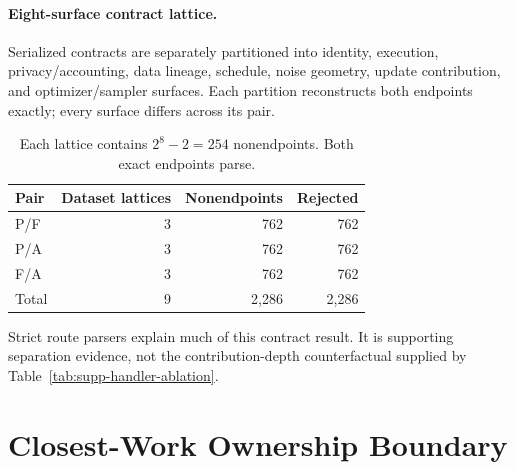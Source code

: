 \documentclass[letterpaper]{article}
\begin{document}
\paragraph{Eight-surface contract lattice.}
Serialized contracts are separately partitioned into identity, execution,
privacy/accounting, data lineage, schedule, noise geometry, update
contribution, and optimizer/sampler surfaces.  Each partition reconstructs
both endpoints exactly; every surface differs across its pair.

\begin{table}[t]
\centering
\footnotesize
\setlength{\tabcolsep}{4pt}
\begin{tabular}{@{}lrrr@{}}
\toprule
Pair & Dataset lattices & Nonendpoints & Rejected \\
\midrule
P/F & 3 & 762 & 762 \\
P/A & 3 & 762 & 762 \\
F/A & 3 & 762 & 762 \\
\midrule
Total & 9 & 2,286 & 2,286 \\
\bottomrule
\end{tabular}
\caption{Each lattice contains $2^8-2=254$ nonendpoints.  Both exact endpoints
parse.}
\label{tab:supp-contract-lattice}
\end{table}

Strict route parsers explain much of this contract result.  It is supporting
separation evidence, not the contribution-depth counterfactual supplied by
Table~\ref{tab:supp-handler-ablation}.

\section{Closest-Work Ownership Boundary}
\end{document}
